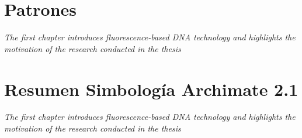 \chapter{Patrones}
\label{chap:anexos}
\textit{The first chapter introduces fluorescence-based DNA technology and highlights the motivation of the research conducted in the thesis}
\vfill
\minitoc
\newpage

\blindtext

\chapter{Resumen Simbología Archimate 2.1}
\label{chap:anexos}
\textit{The first chapter introduces fluorescence-based DNA technology and highlights the motivation of the research conducted in the thesis}
\vfill
\minitoc
\newpage

